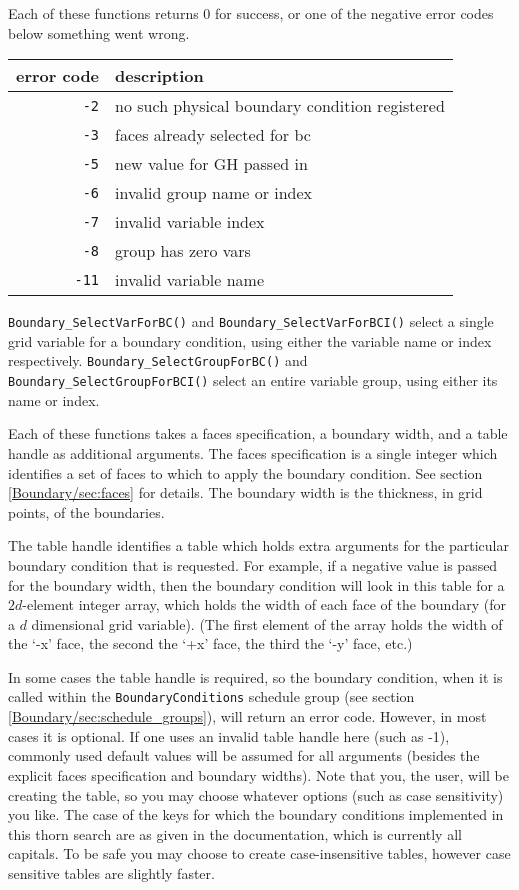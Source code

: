 \documentclass{article}
\begin{document}
Each of these functions returns 0 for success, or one of the negative error
codes below something went wrong.

\begin{tabular}{|r|l|}
\hline
\multicolumn{1}{|l|}{\textbf{error code}} & \textbf{description} \\
\hline
{\tt  -2} & no such physical boundary condition registered \\
{\tt  -3} & faces already selected for bc \\
{\tt  -5} & new value for GH passed in \\
{\tt  -6} & invalid group name or index \\
{\tt  -7} & invalid variable index \\
{\tt  -8} & group has zero vars \\
{\tt -11} & invalid variable name \\
\hline
\end{tabular}

\verb|Boundary_SelectVarForBC()| and \verb|Boundary_SelectVarForBCI()|
select a single grid variable for a boundary condition,
using either the variable name or index respectively.
\verb|Boundary_SelectGroupForBC()| and \verb|Boundary_SelectGroupForBCI()|
select an entire variable group, using either its name or index.

Each of these functions takes a faces specification, a boundary width,
and a table handle as additional arguments.
The faces specification is a single integer which identifies a set of
faces to which to apply the boundary condition.  See section
\ref{Boundary/sec:faces} for details.  The boundary width is the thickness,
in grid points, of the boundaries.  

The table handle identifies a table which
holds extra arguments for the particular boundary condition that is
requested.  
For example, if a negative value is passed for the boundary width, then the
boundary condition will look in this table for a $2d$-element integer
array, which holds the width of each face of the boundary (for a $d$
dimensional grid variable).  (The first element of the array holds the
width of the `-x' face, the second the `+x' face, the third the `-y'
face, etc.)

In some cases the table handle is required, so the boundary condition,
when it is called within the \texttt{BoundaryConditions} schedule
group (see section \ref{Boundary/sec:schedule_groups}), will return
an error code.  However, in most cases it is optional.  If one uses
an invalid table handle here (such as -1), commonly used default
values will be assumed for all arguments (besides the explicit faces
specification and boundary widths).  Note that you, the user, will
be creating the table, so you may choose whatever options (such as
case sensitivity) you like.  The case of the keys for which the
boundary conditions implemented in this thorn search are as given
in the documentation, which is currently all capitals.  To be safe
you may choose to create case-insensitive tables, however case
sensitive tables are slightly faster.
\end{document}
